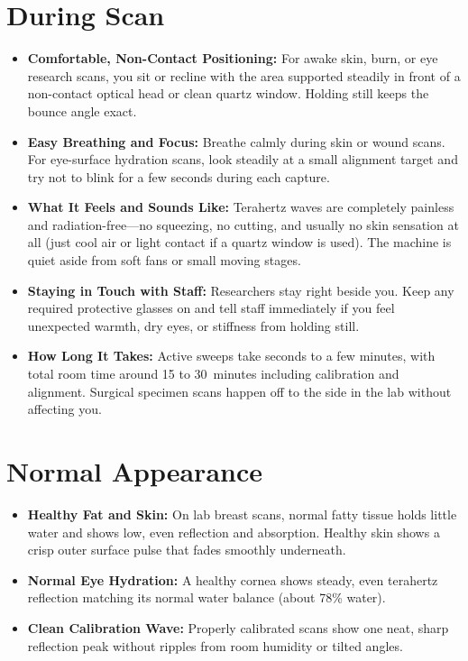 \section{During Scan}
\begin{itemize}
  \item \textbf{Comfortable, Non-Contact Positioning:} For awake skin, burn, or eye research scans, you sit or recline with the area supported steadily in front of a non-contact optical head or clean quartz window. Holding still keeps the bounce angle exact.
  \item \textbf{Easy Breathing and Focus:} Breathe calmly during skin or wound scans. For eye-surface hydration scans, look steadily at a small alignment target and try not to blink for a few seconds during each capture.
  \item \textbf{What It Feels and Sounds Like:} Terahertz waves are completely painless and radiation-free---no squeezing, no cutting, and usually no skin sensation at all (just cool air or light contact if a quartz window is used). The machine is quiet aside from soft fans or small moving stages.
  \item \textbf{Staying in Touch with Staff:} Researchers stay right beside you. Keep any required protective glasses on and tell staff immediately if you feel unexpected warmth, dry eyes, or stiffness from holding still.
  \item \textbf{How Long It Takes:} Active sweeps take seconds to a few minutes, with total room time around 15 to 30~minutes including calibration and alignment. Surgical specimen scans happen off to the side in the lab without affecting you.
\end{itemize}

\section{Normal Appearance}
\begin{itemize}
  \item \textbf{Healthy Fat and Skin:} On lab breast scans, normal fatty tissue holds little water and shows low, even reflection and absorption. Healthy skin shows a crisp outer surface pulse that fades smoothly underneath.
  \item \textbf{Normal Eye Hydration:} A healthy cornea shows steady, even terahertz reflection matching its normal water balance (about 78\% water).
  \item \textbf{Clean Calibration Wave:} Properly calibrated scans show one neat, sharp reflection peak without ripples from room humidity or tilted angles.
\end{itemize}

